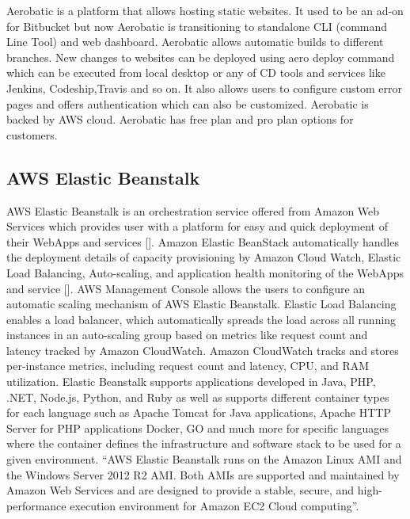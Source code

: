 Aerobatic is a platform that allows hosting static
websites\cite{www-aero}. It used to be an ad-on for Bitbucket but now
Aerobatic is transitioning to standalone CLI (command Line Tool) and
web dashboard. Aerobatic allows automatic builds to different
branches. New changes to websites can be deployed using aero deploy
command which can be executed from local desktop or any of CD tools
and services like Jenkins, Codeship,Travis and so on.  It also allows
users to configure custom error pages and offers authentication which
can also be customized. Aerobatic is backed by AWS cloud. Aerobatic
has free plan and pro plan options for customers.



\subsection{AWS Elastic Beanstalk}

AWS Elastic Beanstalk is an orchestration service offered from Amazon
Web Services which provides user with a platform for easy and quick
deployment of their WebApps and
services [\cite{www-amazon-elastic-beanstalk}]. Amazon Elastic BeanStack
automatically handles the deployment details of capacity provisioning
by Amazon Cloud Watch, Elastic Load Balancing, Auto-scaling, and
application health monitoring of the WebApps and
service [\cite{amazon-elastic-beanstalk-book}]. AWS Management Console
allows the users to configure an automatic scaling mechanism of AWS
Elastic Beanstalk. Elastic Load Balancing enables a load balancer,
which automatically spreads the load across all running instances in
an auto-scaling group based on metrics like request count and latency
tracked by Amazon CloudWatch. Amazon CloudWatch tracks and stores
per-instance metrics, including request count and latency, CPU, and
RAM utilization. Elastic Beanstalk supports applications developed in
Java, PHP, .NET, Node.js, Python, and Ruby as well as supports
different container types for each language such as Apache Tomcat for
Java applications, Apache HTTP Server for PHP applications Docker, GO
and much more for specific languages where the container defines the
infrastructure and software stack to be used for a given
environment. ``AWS Elastic Beanstalk runs on the Amazon Linux AMI and
the Windows Server 2012 R2 AMI. Both AMIs are supported and maintained
by Amazon Web Services and are designed to provide a stable, secure,
and high-performance execution environment for Amazon EC2 Cloud
computing''\cite{www-amazon-elastic-beanstalk}.

